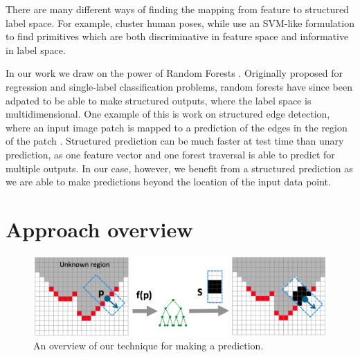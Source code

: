 \documentclass[10pt,twocolumn,letterpaper]{article}
\begin{document}
There are many different ways of finding the mapping from feature to structured label space.
For example, \cite{bourdev-iccv-2009} cluster human poses, while \cite{fouhey-iccv-2013} use an SVM-like formulation to find primitives which are both discriminative in feature space and informative in label space.

In our work we draw on the power of Random Forests \cite{breiman-ml-2001}.
Originally proposed for regression and single-label classification problems, random forests have since been adpated to be able to make structured outputs, where the label space is multidimensional.
One example of this is work on structured edge detection, where an input image patch is mapped to a prediction of the edges in the region of the patch \cite{dollar-iccv-2013}.
Structured prediction can be much faster at test time than unary prediction, as one feature vector and one forest traversal is able to predict for multiple outputs.
In our case, however, we benefit from a structured prediction as we are able to make predictions beyond the location of the input data point.




\section{Approach overview}


\begin{figure}[tb]
    \includegraphics[width=2.0\columnwidth]{overview}
    \caption{
    An overview of our technique for making a prediction. 
    }%
    \label{fig:overview}
\end{figure}
\end{document}
